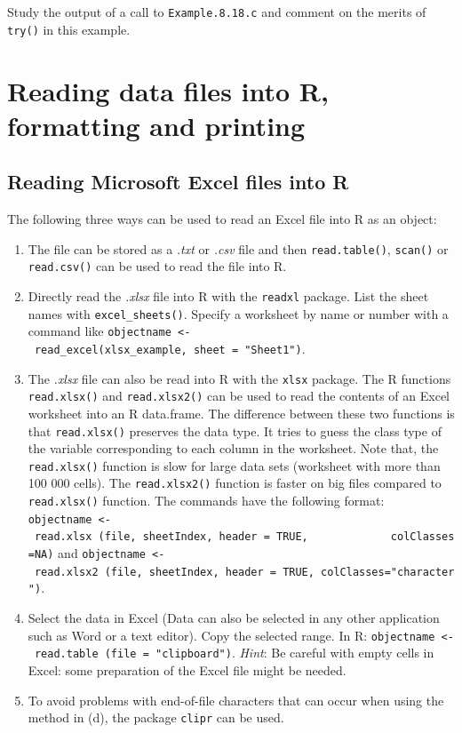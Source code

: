 \documentclass[
]{book}
\begin{document}
Study the output of a call to \texttt{Example.8.18.c} and comment on the merits of \texttt{try()} in this example.

\chapter{Reading data files into R, formatting and printing}\label{data}

\section{Reading Microsoft Excel files into R}\label{reading-microsoft-excel-files-into-r}

The following three ways can be used to read an Excel file into R as an object:

\begin{enumerate}
\def\labelenumi{(\alph{enumi})}
\item
  The file can be stored as a \emph{{.txt}} or \emph{{.csv}} file and then \texttt{read.table()}, \texttt{scan()} or \texttt{read.csv()} can be used to read the file into R.
\item
  Directly read the \emph{{.xlsx}} file into R with the \texttt{readxl} package. List the sheet names with \texttt{excel\_sheets()}. Specify a worksheet by name or number with a command like \texttt{objectname\ \textless{}-\ read\_excel(xlsx\_example,\ sheet\ =\ "Sheet1")}.
\item
  The \emph{{.xlsx}} file can also be read into R with the \texttt{xlsx} package. The R functions \texttt{read.xlsx()} and \texttt{read.xlsx2()} can be used to read the contents of an Excel worksheet into an R data.frame. The difference between these two functions is that \texttt{read.xlsx()} preserves the data type. It tries to guess the class type of the variable corresponding to each column in the worksheet. Note that, the \texttt{read.xlsx()} function is slow for large data sets (worksheet with more than 100 000 cells). The \texttt{read.xlsx2()} function is faster on big files compared to \texttt{read.xlsx()} function. The commands have the following format: \texttt{objectname\ \textless{}-\ read.xlsx\ (file,\ sheetIndex,\ header\ =\ TRUE,\ \ \ \ \ \ \ \ \ \ \ \ \ colClasses=NA)} and \texttt{objectname\ \textless{}-\ read.xlsx2\ (file,\ sheetIndex,\ header\ =\ TRUE,\ colClasses="character")}.
\item
  Select the data in Excel (Data can also be selected in any other application such as Word or a text editor). Copy the selected range. In R:
  \texttt{objectname\ \textless{}-\ read.table\ (file\ =\ "clipboard")}. \emph{Hint}: Be careful with empty cells in Excel: some preparation of the Excel file might be needed.
\item
  To avoid problems with end-of-file characters that can occur when using the method in (d), the package \texttt{clipr} can be used.
\end{enumerate}
\end{document}
